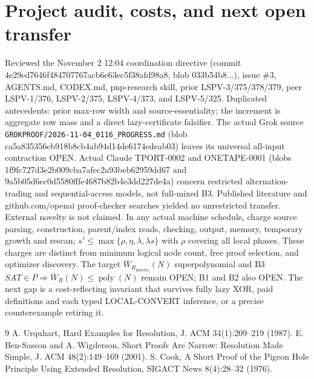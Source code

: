 \documentclass[11pt]{article}
\begin{document}
\section*{Project audit, costs, and next open transfer}
Reviewed the November 2 12:04 coordination directive (commit 4e29ed7646f484707767acb6e63ec5f38afd98a8, blob 033b54b8...), issue \#3, AGENTS.md, CODEX.md, pnp-research skill, prior LSPV-3/375/378/379, peer LSPV-1/376, LSPV-2/375, LSPV-4/373, and LSPV-5/325. Duplicated antecedents: prior max-row width and source-essentiality; the increment is aggregate row mass and a direct lazy-certificate falsifier. The actual Grok source \texttt{GROKPROOF/2026-11-04\_0116\_PROGRESS.md} (blob ca5a835356eb918b8cb4ab94d14de6174edeab03) leaves its universal all-input contraction OPEN. Actual Claude TPORT-0002 and ONETAPE-0001 (blobs 1f9fc727d3e2b009cba7afec2a93beb62959dd67 and 9a5b05d6ec0d5580fffe4687b82b4e3dd227de4a) concern restricted alternation-trading and sequential-access models, not full-mixed B3. Published literature and github.com/openai proof-checker searches yielded no unrestricted transfer. External novelty is not claimed.
In any actual machine schedule, charge source parsing, construction, parent/index reads, checking, output, memory, temporary growth and rescan; \(s'\le\max\{\rho,\eta,\lambda,\lambda s\}\) with \(\rho\) covering all local phases. These charges are distinct from minimum logical node count, free proof selection, and optimizer discovery. The target \(\overline W_{R_{\mathrm{mix341}}}(N)\) superpolynomial and B3 \(SAT\in P\Rightarrow \overline W_R(N)\le\operatorname{poly}(N)\) remain OPEN; B1 and B2 also OPEN. The next gap is a cost-reflecting invariant that survives fully lazy XOR, paid definitions and each typed LOCAL-CONVERT inference, or a precise counterexample retiring it.
\begin{thebibliography}{9}
 A. Urquhart, Hard Examples for Resolution, J. ACM 34(1):209--219 (1987).
 E. Ben-Sasson and A. Wigderson, Short Proofs Are Narrow: Resolution Made Simple, J. ACM 48(2):149--169 (2001).
 S. Cook, A Short Proof of the Pigeon Hole Principle Using Extended Resolution, SIGACT News 8(4):28--32 (1976).
\end{thebibliography}
\end{document}

